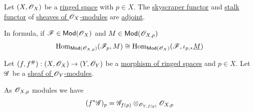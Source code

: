 \documentclass[../../../main]{subfiles}
\begin{document}
\begin{corollary} \label{cor:stalk-skyscraper-adjunction-ox-mod}
  Let \((X, \mathscr{O}_{X})\) be a \hyperref[def:ringed-space]{ringed space} with \(p \in X\).
  The \hyperref[def:skyscraper-ox-mod]{skyscraper functor} and \hyperref[def:stalk-ox-mod]{stalk functor} of \hyperref[def:sheaf-of-modules]{sheaves of \(\mathscr{O}_{X}\)-modules} are \hyperref[def:adjoint-functors]{adjoint}.

  In formula, if \(\mathscr{F} \in \mathsf{Mod}(\mathscr{O}_{X})\) and \(M \in \mathsf{Mod}(\mathscr{O}_{X, p})\)
  \begin{equation*}
    \operatorname{Hom}_{\mathsf{Mod}(\mathscr{O}_{X, p})}(\mathscr{F}_{p}, M) \cong \operatorname{Hom}_{\mathsf{Mod}(\mathscr{O}_{X})} (\mathscr{F}, \iota_{p, \ast}\underline{M})
  \end{equation*}
\end{corollary}



\begin{lemma}
  Let \((f, f^{\#}): (X, \mathscr{O}_{X}) \to (Y, \mathscr{O}_{Y})\) be a \hyperref[def:ringed-space]{morphism of ringed spaces} and \(p \in X\).
  Let \(\mathscr{G}\) be a \hyperref[def:sheaf-of-modules]{sheaf of \(\mathscr{O}_{Y}\)-modules}.

  As \(\mathscr{O}_{X, p}\) modules we have
  \begin{equation*}
    (f^{\ast}\mathscr{G})_{p} = \mathscr{G}_{f(p)} \otimes_{\mathscr{O}_{Y, f(p)}} \mathscr{O}_{X, p}
  \end{equation*}
\end{lemma}
\end{document}

